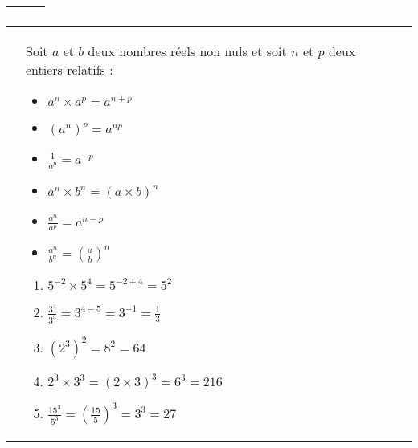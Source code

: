 \documentclass[10pt,a4paper]{article}
\begin{document}
\begin{tabular}{|>{\centering\arraybackslash}p{1.2cm}|>{\raggedright\arraybackslash}p{15.5cm}|>{\centering\arraybackslash}p{0.8cm}|}
\begin{exemple}
\end{exemple}

& \\ 
\hline
\end{tabular}

\begin{tabular}{|>{\centering\arraybackslash}p{1.2cm}|>{\raggedright\arraybackslash}p{15.5cm}|>{\centering\arraybackslash}p{0.8cm}|}
\hline
     & 
\vspace{0mm}

\begin{Prop}
    Soit $ a $ et $ b $ deux nombres réels non nuls et soit $ n $ et $ p $ deux entiers relatifs :
    \begin{multicols}{3}
        \begin{itemize}
            \item $ a^n \times a^p = a^{n+p} $
            \item $ (a^n)^p = a^{np} $
            \item $ \displaystyle\frac{1}{a^p} = a^{-p} $
            \item $ a^n \times b^n = (a \times b)^n $
            \item $ \displaystyle\frac{a^n}{a^p} = a^{n-p} $
            \item $ \displaystyle\frac{a^n}{b^n} = \displaystyle\left(\frac{a}{b}\right)^n $
        \end{itemize}
    \end{multicols}
\end{Prop}

\begin{exemple}
    \begin{multicols}{2}
        \begin{enumerate}
            \item $5^{-2}\times5^4 = 5^{-2+4} = 5^2$
            \item $\displaystyle\frac{3^4}{3^5} = 3^{4-5} = 3^{-1} = \displaystyle\frac{1}{3}$
            \item $(2^3)^2 = 8^2 = 64$
            \item $2^3\times 3^3 = (2\times 3)^3 = 6^3 = 216$
            \item $\displaystyle\frac{15^3}{5^3} = \displaystyle(\frac{15}{5})^3 = 3^3 = 27$
        \end{enumerate}
    \end{multicols}
\end{exemple}


\end{tabular}
\end{document}
